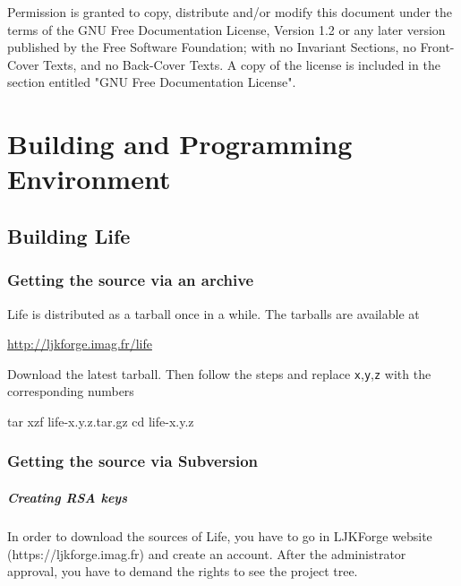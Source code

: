 \documentclass[a4paper]{book}
\newcommand{\life}{Life\xspace}
\begin{document}
\begin{center}
\end{center}

\vfill \mbox{} \clearpage

\thispagestyle{empty}


\vfill
Permission is granted to copy, distribute and/or modify this document
under the terms of the GNU Free Documentation License, Version 1.2
or any later version published by the Free Software Foundation;
with no Invariant Sections, no Front-Cover Texts, and no Back-Cover Texts.
A copy of the license is included in the section entitled "GNU
Free Documentation License".

\newpage

\tableofcontents

\chapter{Building and Programming Environment}


\section{Building Life}

\subsection{Getting the source via an archive}
\label{sec:getting-source-via-1}

\life is distributed as a tarball once in a while. The tarballs are available
at
\begin{center}
  \href{http://ljkforge.imag.fr/life}{http://ljkforge.imag.fr/life}
\end{center}
Download the latest tarball. Then follow the steps and replace
\texttt{x},\texttt{y},\texttt{z} with the corresponding numbers

\begin{unixcom}
  tar xzf life-x.y.z.tar.gz
  cd life-x.y.z
\end{unixcom}


\subsection{Getting the source via Subversion}
\label{sec:getting-source-via}

\paragraph{Creating RSA keys}
\label{sec:creation-rsa-keys}
In order to download the sources of \life, you have to go in
LJKForge website (https://ljkforge.imag.fr) and create an account. After the
administrator approval, you have to demand the rights to see the project tree.
\end{document}
